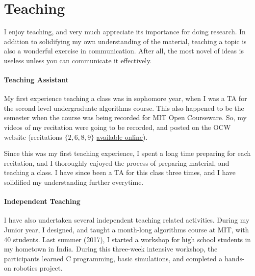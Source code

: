 \section*{Teaching}

I enjoy teaching, and very much appreciate its importance for doing research.
In addition to solidifying my own understanding of the material, teaching a topic is also a wonderful exercise in communication.
After all, the most novel of ideas is useless unless you can communicate it effectively.

\paragraph{Teaching Assistant}
\label{par:teaching_assistant}
My first experience teaching a class was in sophomore year, when I was a TA for the second level undergraduate algorithms course.
This also happened to be the semester when the course was being recorded for MIT Open Courseware.
So, my videos of my recitation were going to be recorded, and posted on the OCW website (recitations $\{2,6,8,9\}$
\href{https://ocw.mit.edu/courses/electrical-engineering-and-computer-science/6-046j-design-and-analysis-of-algorithms-spring-2015/recitation-videos/}{available online}).

Since this was my first teaching experience, I spent a long time preparing for each recitation,
and I thoroughly enjoyed the process of preparing material, and teaching a class.
I have since been a TA for this class three times, and I have solidified my understanding further everytime.

\paragraph{Independent Teaching}
\label{par:independent_teaching}
I have also undertaken several independent teaching related activities.
During my Junior year, I designed, and taught a month-long algorithms course at MIT, with 40 students.
Last summer (2017), I started a workshop for high school students in my hometown in India.
During this three-week intensive workshop, the participants learned C programming,
basic simulations, and completed a hands-on robotics project.
